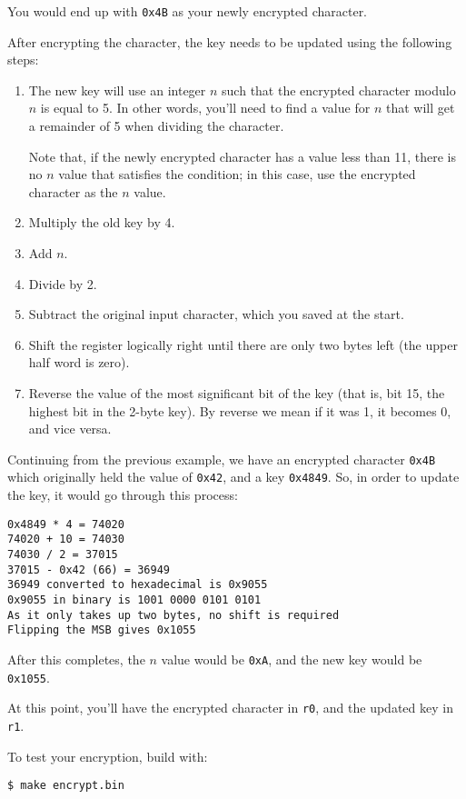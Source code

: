 \documentclass{article}
\def\r#1{\texttt{r#1}}
\begin{document}
You would end up with {\tt 0x4B} as your newly encrypted character.\newline


After encrypting the character, the key needs to be updated using the 
following steps:

\begin{enumerate} \item The new key will use an integer $n$ such that the 
encrypted character modulo $n$ is equal to 5. In other words, you'll need 
to find a value for $n$ that will get a remainder of 5 when dividing the
character.

Note that, if the newly encrypted character has a value less than 11, there
is no $n$ value that satisfies the condition; in this case, use the encrypted
character as the $n$ value.
\item Multiply the old key by 4.
\item Add $n$.
\item Divide by 2.
\item Subtract the original input character, which you saved at the start.
\item Shift the register logically right until there are only two bytes left
(the upper half word is zero).
\item Reverse the value of the most significant bit of the key (that is, bit
15, the highest bit in the 2-byte key). By reverse we mean if it was 1, it becomes 
0, and vice versa.
\end{enumerate}

Continuing from the previous example, we have an encrypted character 
{\tt 0x4B} which originally held the value of {\tt 0x42}, and a key 
{\tt 0x4849}. So, in order to update the key, it would go through this 
process:
\begin{verbatim}
0x4849 * 4 = 74020
74020 + 10 = 74030
74030 / 2 = 37015
37015 - 0x42 (66) = 36949
36949 converted to hexadecimal is 0x9055
0x9055 in binary is 1001 0000 0101 0101
As it only takes up two bytes, no shift is required
Flipping the MSB gives 0x1055
\end{verbatim}

After this completes, the $n$ value would be {\tt 0xA}, and the new key 
would be {\tt 0x1055}.


At this point, you'll have the encrypted character in \r{0}, and the updated
key in \r{1}.

To test your encryption, build with:

\begin{verbatim}
$ make encrypt.bin
\end{verbatim}
\end{document}
